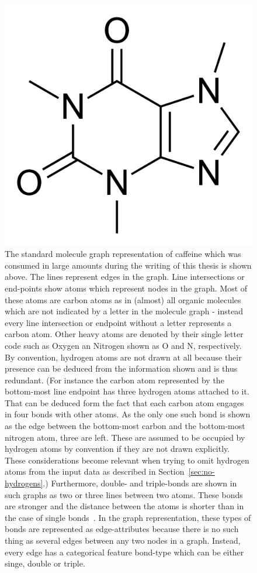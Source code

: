 \begin{figure}[H]
	\centering
	\includegraphics[width=0.7\linewidth]{figures/caffeine}
	\caption{The standard molecule graph representation of caffeine which was consumed in large amounts during the writing of this thesis is shown above. The lines represent edges in the graph. Line intersections or end-points show atoms which represent nodes in the graph. Most of these atoms are carbon atoms as in (almost) all organic molecules which are not indicated by a letter in the molecule graph - instead every line intersection or endpoint without a letter represents a carbon atom. Other heavy atoms are denoted by their single letter code such as Oxygen an Nitrogen shown as O and N, respectively.
	By convention, hydrogen atoms are not drawn at all because their presence can be deduced from the information shown and is thus redundant. (For instance the carbon atom represented by the bottom-most line endpoint has three hydrogen atoms attached to it. That can be deduced form the fact that each carbon atom engages in four bonds with other atoms. As the only one such bond is shown as the edge between the bottom-most carbon and the bottom-most nitrogen atom, three are left. These are assumed to be occupied by hydrogen atoms by convention if they are not drawn explicitly. These considerations become relevant when trying to omit hydrogen atoms from the input data as described in Section~\ref{sec:no-hydrogens}.)
	Furthermore, double- and triple-bonds are shown in such graphs as two or three lines between two atoms. These bonds are stronger and the distance between the atoms is shorter than in the case of single bonds~\cite{Organic-chemistry}. In the graph representation, these types of bonds are represented as edge-attributes because there is no such thing as several edges between any two nodes in a graph. Instead, every edge has a categorical feature bond-type which can be either singe, double or triple.
	}
	\label{fig:caffeine}
\end{figure}


